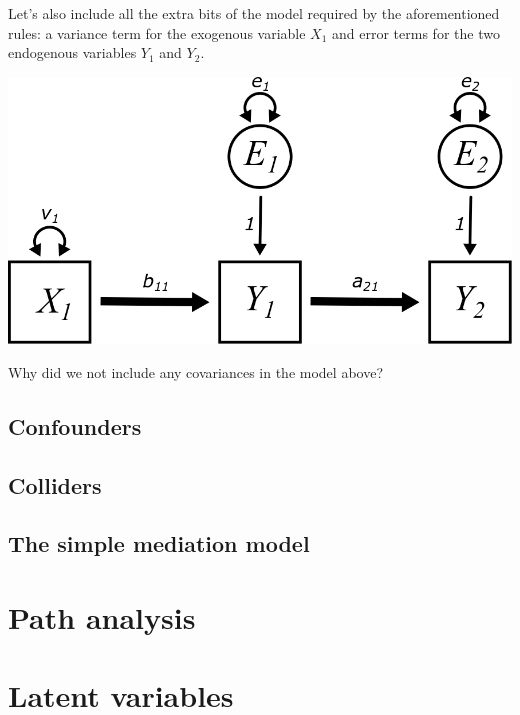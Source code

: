 \documentclass[
]{book}
\begin{document}
Let's also include all the extra bits of the model required by the aforementioned rules: a variance term for the exogenous variable \(X_{1}\) and error terms for the two endogenous variables \(Y_{1}\) and \(Y_{2}\).

\begin{center}\includegraphics{graphics/mediator_vars} \end{center}

Why did we not include any covariances in the model above?

\hypertarget{mediation-confounders}{%
\section{Confounders}\label{mediation-confounders}}

\hypertarget{mediation-colliders}{%
\section{Colliders}\label{mediation-colliders}}

\hypertarget{mediation-simple}{%
\section{The simple mediation model}\label{mediation-simple}}

\hypertarget{path}{%
\chapter{Path analysis}\label{path}}

\hypertarget{latent}{%
\chapter{Latent variables}\label{latent}}
\end{document}
